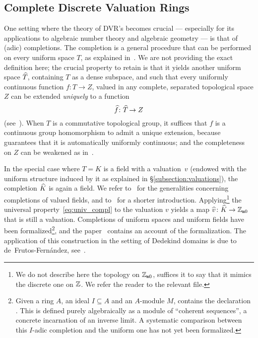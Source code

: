 \documentclass[sigplan,10pt, nonacm, review]{acmart}
\begin{document}
\subsection{Complete Discrete Valuation Rings}\label{subsec:complete_DVR}
One setting where the theory of DVR's becomes crucial --- especially for its applications to algebraic number theory and algebraic geometry --- is that of (adic) completions. The completion is a general procedure that can be performed on every uniform space $T$, as explained in~\cite[Chapitre~II, \S3]{Bou71}. We are not providing the exact definition here; the crucial property to retain is that it yields another uniform space $\compl{T}$, containing $T$ as a dense subspace, and such that every uniformly continuous function $f\colon T \to Z$, valued in any complete, separated topological space $Z$ can be extended \emph{uniquely} to a function
\begin{equation}\label{eq:univ_compl}
\compl{f}\colon\compl{T}\rightarrow Z
\end{equation}
(see~\cite[Chapitre~II, \S3, n$^\circ$6, Théorème~2]{Bou71}). When $T$ is a commutative topological group, it suffices that $f$ is a continuous group homomorphism to admit a unique extension, because \cite[Chapitre~III, \S3, n$^\circ$1, Proposition~3]{Bou71} guarantees that it is automatically uniformly continuous; and the completeness on $Z$ can be weakened as in~\cite[Chapitre~I, \S8, n$^\circ$5, Théorème~1]{Bou71}.

In the special case where $T=K$ is a field with a valuation~$v$ (endowed with the uniform structure induced by it as explained in \S\ref{subsection:valuations}), the completion $\compl{K}$ is again a field. We refer to~\cite[Chapitre~VI, \S5, n$^\circ$3]{Bou85} for the generalities concerning completions of valued fields, and to~\cite[Chapitre~II, \S1]{Ser62} for a shorter introduction. Applying\footnote{We do not describe here the topology on $\mathbb{Z}_{\mathtt{m}0}$, suffices it to say that it mimics the discrete one on $\mathbb{Z}$. We refer the reader to the relevant \mathlib file\href{https://leanprover-community.github.io/mathlib_docs/topology/algebra/with_zero_topology.html}{\extlink}.} the universal property~\eqref{eq:univ_compl} to the valuation $v$ yields a map $\compl{v}\colon \compl{K}\rightarrow \wzmZZ$ that is still a valuation. Completions of uniform spaces and uniform fields have been formalized\footnote{Given a ring $A$, an ideal $I\subseteq A$ and an $A$-module $M$, \mathlib contains the declaration . This is defined purely algebraically as a module of ``coherent sequences'', a concrete incarnation of an inverse limit. A systematic comparison between this $I$-adic completion and the uniform one has not yet been formalized.}, and the paper~\cite{BuzComMas20} contains an account of the formalization. The application of this construction in the setting of Dedekind domains is due to de~Frutos-Fernández, see~\cite{deF22}. 
\end{document}
